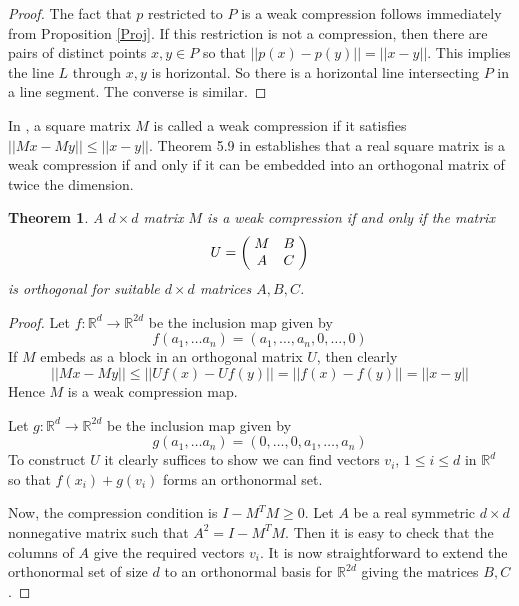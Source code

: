 \documentclass[a4paper, 12pt]{amsart}
\theoremstyle{plain}
\newtheorem{Thm}{Theorem}
\begin{document}
\begin{proof}
The fact that $p$ restricted to $P$ is a weak compression follows immediately from Proposition \ref{Proj}. If this restriction is not a compression, then there are pairs of distinct points $x,y \in P$ so that $||p(x) - p(y)||=||x-y||$. This implies the line $L$ through $x,y$ is horizontal. So there is a horizontal line intersecting $P$ in a line segment. The converse is similar. 

\end{proof}


In \cite{zhang}, a square matrix $M$ is called a weak compression if it satisfies $||Mx-My|| \le ||x-y||$.
Theorem 5.9 in \cite{zhang} establishes that a real square matrix is a weak compression if and only if it can be embedded into an orthogonal matrix of twice the dimension.


\begin{Thm}\label{orthog} 
A $d \times d$ matrix $M$ is a weak compression if and only if the matrix
\[ U=
\left(\begin{array}{@{}cc@{}}
  \begin{matrix}
  \hspace{.1cm}M \\
  \end{matrix}
  & B \hspace{.1cm} \\
 \hspace{.1cm} A &
  \begin{matrix}
  C \hspace{.1cm} \\
  \end{matrix}
\end{array}\right)
\]
is orthogonal for suitable $d \times d$ matrices $A,B,C$.
\end{Thm}

\begin{proof}
Let $f:\mathbb{R}^d \to \mathbb{R}^{2d}$ be the inclusion map given by $$f(a_1, \dots a_n) =(a_1, \dots ,a_n, 0, \dots ,0)$$
If $M$ embeds as a block in an orthogonal matrix $U$, then clearly $$||Mx-My|| \le ||Uf(x)-Uf(y)||=||f(x)-f(y)||=||x-y|| $$
Hence $M$ is a weak compression map. 

Let $g:\mathbb{R}^d \to \mathbb{R}^{2d}$ be the inclusion map given by $$g(a_1, \dots a_n) =(0, \dots ,0, a_1, \dots ,a_n)$$ To construct $U$ it clearly suffices to show we can find vectors $v_i$, $ 1 \le i \le d$ in $\mathbb{R}^{d}$ so that $f(x_i)+g(v_i)$ forms an orthonormal set. 

Now, the compression condition is $I-M^TM \ge 0$. Let $A$ be a real symmetric $d \times d$ nonnegative matrix such that $A^2=I-M^TM$. Then it is easy to check that the columns of $A$ give the required vectors $v_i$. It is now straightforward to extend the orthonormal set of size $d$ to an orthonormal basis for $\mathbb{R}^{2d}$ giving the matrices $B,C$.
\end{proof}
\end{document}
